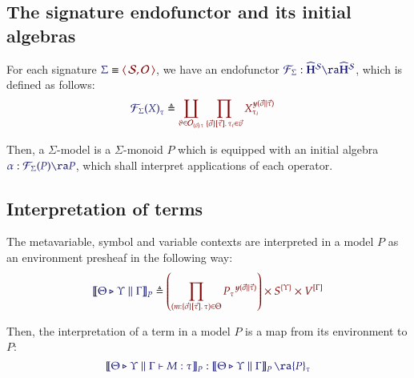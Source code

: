 \documentclass[11pt]{article}
\theoremstyle{definition}
\theoremstyle{remark}
\numberwithin{equation}{section}
\def\IModeColorName{MidnightBlue}
\def\OModeColorName{Maroon}
\newcommand\IMode[1]{{\color{\IModeColorName}{#1}}}
\newcommand\OMode[1]{{\color{\OModeColorName}{#1}}}
\newcommand\Of[2]{\IMode{#1}: \IMode{#2}}
\newcommand\MkValence[3]{%
  \ifthenelse{\equal{#1}{}}{}{%
    \{#1\}%
  }%
  \ifthenelse{\equal{#2}{}}{}{%
    [#2]%
  }.\, #3%
}
\newcommand\MkArity[2]{(#1)\, #2}
\newcommand\Match[2]{\IMode{#1}\equiv\OMode{#2}}
\newcommand\Sorts{\mathcal{S}}
\newcommand\Operators{\mathcal{O}}
\newcommand\HypCat{\mathbf{H}}
\newcommand\Pair[2]{\left\langle\,#1,#2\,\right\rangle}
\newcommand\Define[2]{\IMode{#1}\triangleq\OMode{#2}}
\newcommand\SigFun[1]{\mathcal{F}_{#1}}
\newcommand\SemBrackets[1]{\left\llbracket#1\right\rrbracket}
\newcommand\Yoneda[1]{\boldsymbol{y} (#1)}
\begin{document}
\subsection{The signature endofunctor and its initial algebras}

For each signature $\Match{\Sigma}{\Pair{\Sorts}{\Operators}}$, we have an
endofunctor
$\Of{\SigFun{\Sigma}}{\widehat{\HypCat}^\Sorts\ra\widehat{\HypCat}^\Sorts}$,
which is defined as follows:
\begin{align*}
  \IMode{{\SigFun{\Sigma}(X)}_{\tau}}
&
    \triangleq
    \OMode{
      \coprod_{
        \vartheta\in \Operators_{\MkArity{\vec{v}}{\tau}}
      }
      \prod_{
        \MkValence
          {\vec{\sigma}}
          {\vec{\tau}}
          {\tau_i}
        \in\vec{v}
      }
      X_{\tau_i}^{\Yoneda{\vec{\sigma}\parallel\vec{\tau}}}
    }
\end{align*}

Then, a $\Sigma$-model is a $\Sigma$-monoid $P$ which is equipped with an
initial algebra $\Of{\alpha}{\SigFun{\Sigma}(P)\ra P}$, which shall interpret
applications of each operator.

\subsection{Interpretation of terms}

The metavariable, symbol and variable contexts are interpreted in a model $P$ as
an environment presheaf in the following way:
\[
  \Define{
    \SemBrackets{
      \Theta\triangleright\Upsilon\parallel\Gamma
    }_P
  }{
    \left(
      \prod_{
        (m:%
        \MkValence
          {\vec{\sigma}}
          {\vec{\tau}}
          {\tau})
        \in\Theta
      }{{P_{\tau}}^{\Yoneda{\vec{\sigma}\parallel\vec{\tau}}}}
    \right)
    \times
    S^{\{\Upsilon\}}
    \times
    V^{[\Gamma]}
  }
\]

Then, the interpretation of a term in a model $P$ is a map from its environment
to $P$:
\[
  \Of{
    \SemBrackets{
      \Theta\triangleright\Upsilon\parallel\Gamma\vdash M:\tau
    }_{P}
  }{
    \SemBrackets{
      \Theta\triangleright\Upsilon\parallel\Gamma
    }_{P}\ra {P}_{\tau}
  }
\]
\end{document}
